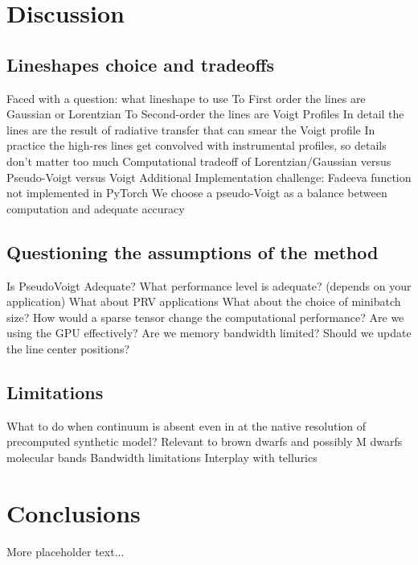 \documentclass[modern]{aastex631}
\begin{document}
\section{Discussion}

\subsection{Lineshapes choice and tradeoffs}
\begin{outline}
 \1 Faced with a question: what lineshape to use
 \2 To First order the lines are Gaussian or Lorentzian
 \2 To Second-order the lines are Voigt Profiles
 \2 In detail the lines are the result of radiative transfer that can smear the Voigt profile
 \2 In practice the high-res lines get convolved with instrumental profiles, so details don't matter too much
 \1 Computational tradeoff of Lorentzian/Gaussian versus Pseudo-Voigt versus Voigt
 \2 Additional Implementation challenge: Fadeeva function not implemented in PyTorch
 \1 We choose a pseudo-Voigt as a balance between computation and adequate accuracy
\end{outline}

\subsection{Questioning the assumptions of the method}

\begin{outline}
 \1 Is PseudoVoigt Adequate?
 \1 What performance level is adequate? (depends on your application)
 \1 What about PRV applications
 \1 What about the choice of minibatch size?
 \1 How would a sparse tensor change the computational performance?
 \1 Are we using the GPU effectively? Are we memory bandwidth limited?
 \1 Should we update the line center positions?
\end{outline}

\subsection{Limitations}
\begin{outline}
 \1 What to do when continuum is absent even in at the native resolution of precomputed synthetic model?
 \1 Relevant to brown dwarfs and possibly M dwarfs molecular bands
 \1 Bandwidth limitations
 \1 Interplay with tellurics
\end{outline}

\section{Conclusions}
More placeholder text...
\end{document}
